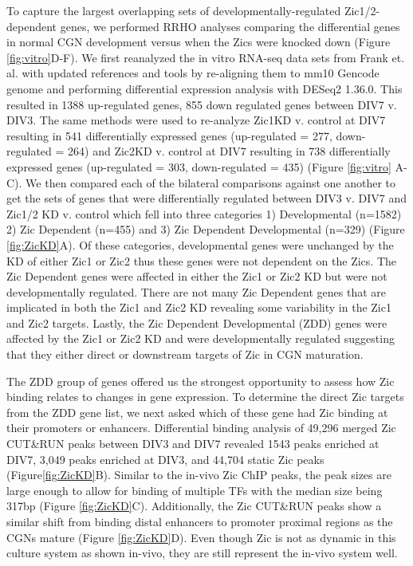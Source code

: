 \documentclass[fleqn,10pt]{wlscirep}
\begin{document}
To capture the largest overlapping sets of developmentally-regulated Zic1/2-dependent genes, we performed RRHO analyses comparing the differential genes in normal CGN development versus when the Zics were knocked down  (Figure \ref{fig:vitro}D-F). We first reanalyzed the in vitro RNA-seq data sets from Frank et. al. \cite{Frank2015RegulationCerebellum} with updated references and tools by re-aligning them to mm10 Gencode genome and performing differential expression analysis with DESeq2 1.36.0. This resulted in 1388 up-regulated genes, 855 down regulated genes between DIV7 v. DIV3. The same methods were used to re-analyze Zic1KD v. control at DIV7 resulting in 541 differentially expressed genes (up-regulated = 277, down-regulated = 264) and Zic2KD v. control at DIV7 resulting in 738 differentially expressed genes (up-regulated = 303, down-regulated = 435) (Figure \ref{fig:vitro} A-C). We then compared each of the bilateral comparisons against one another to get the sets of genes that were differentially regulated between DIV3 v. DIV7 and Zic1/2 KD v. control which fell into three categories 1) Developmental (n=1582) 2) Zic Dependent (n=455) and 3) Zic Dependent Developmental (n=329) (Figure \ref{fig:ZicKD}A). Of these categories, developmental genes were unchanged by the KD of either Zic1 or Zic2 thus these genes were not dependent on the Zics. The Zic Dependent genes  were affected in either the Zic1 or Zic2 KD but were not developmentally regulated. There are not many Zic Dependent genes that are implicated in both the Zic1 and Zic2 KD revealing some variability in the Zic1 and Zic2 targets. Lastly, the Zic Dependent Developmental (ZDD)  genes were affected by the Zic1 or Zic2 KD and were developmentally regulated suggesting that they either direct or downstream targets of Zic in CGN maturation. 

The ZDD group of genes offered us the strongest opportunity to assess how Zic binding relates to changes in gene expression. To determine the direct Zic targets from the ZDD gene list, we next asked which of these gene had Zic binding at their promoters or enhancers. Differential binding analysis of 49,296 merged Zic CUT\&RUN peaks between DIV3 and DIV7 revealed  1543 peaks enriched at DIV7, 3,049 peaks enriched at DIV3, and 44,704 static Zic peaks (Figure\ref{fig:ZicKD}B). Similar to the in-vivo Zic ChIP peaks, the peak sizes are large enough to allow for binding of multiple TFs with the median size being 317bp (Figure \ref{fig:ZicKD}C). Additionally, the Zic CUT\&RUN peaks show a similar shift from binding distal enhancers to promoter proximal regions as the CGNs mature (Figure \ref{fig:ZicKD}D). Even though Zic is not as dynamic in this culture system as shown in-vivo, they are still represent the in-vivo system well. 
\end{document}
